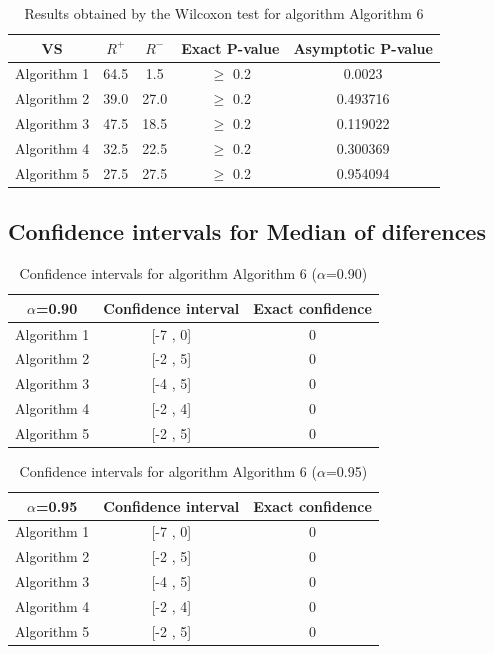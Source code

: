 \documentclass[a4paper,10pt]{article}
\begin{document}
\begin{table}[!htp]
\centering\small
\begin{tabular}{
|c|c|c|c|c|}
\hline
 VS & $R^{+}$ & $R^{-}$ & Exact P-value & Asymptotic P-value \\ \hline 
Algorithm 1 & 64.5 & 1.5 & $\geq$ 0.2 & 0.0023\\ \hline 
Algorithm 2 & 39.0 & 27.0 & $\geq$ 0.2 & 0.493716\\ \hline 
Algorithm 3 & 47.5 & 18.5 & $\geq$ 0.2 & 0.119022\\ \hline 
Algorithm 4 & 32.5 & 22.5 & $\geq$ 0.2 & 0.300369\\ \hline 
Algorithm 5 & 27.5 & 27.5 & $\geq$ 0.2 & 0.954094\\ \hline 

\end{tabular}
\caption{Results obtained by the Wilcoxon test for algorithm Algorithm 6}
\end{table}

\subsection{Confidence intervals for Median of diferences}

\begin{table}[!htp]
\centering\small
\begin{tabular}{
|c|c|c|}
\hline
 $\alpha$=0.90 & Confidence interval & Exact confidence \\ \hline 
Algorithm 1 & [-7 , 0] & 0\\ \hline 
Algorithm 2 & [-2 , 5] & 0\\ \hline 
Algorithm 3 & [-4 , 5] & 0\\ \hline 
Algorithm 4 & [-2 , 4] & 0\\ \hline 
Algorithm 5 & [-2 , 5] & 0\\ \hline 

\end{tabular}
\caption{Confidence intervals for algorithm Algorithm 6 ($\alpha$=0.90)}
\end{table}
\begin{table}[!htp]
\centering\small
\begin{tabular}{
|c|c|c|}
\hline
 $\alpha$=0.95 & Confidence interval & Exact confidence \\ \hline 
Algorithm 1 & [-7 , 0] & 0\\ \hline 
Algorithm 2 & [-2 , 5] & 0\\ \hline 
Algorithm 3 & [-4 , 5] & 0\\ \hline 
Algorithm 4 & [-2 , 4] & 0\\ \hline 
Algorithm 5 & [-2 , 5] & 0\\ \hline 

\end{tabular}
\caption{Confidence intervals for algorithm Algorithm 6 ($\alpha$=0.95)}
\end{table}

 \clearpage 
\end{document}
